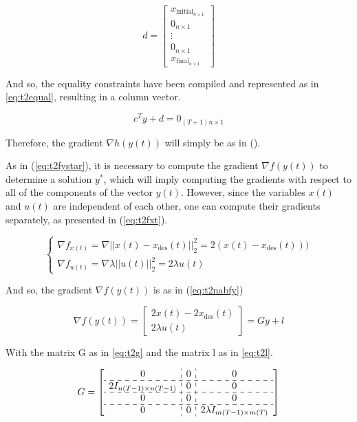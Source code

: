 \begin{equation}
\label{eq:t2d}
d = 
\left[
\begin{array}{c}
x_{{\text{initial}}_{n\times 1}} \\
0_{n\times 1} \\
\vdots \\
0_{n \times 1} \\
x_{{\text{final}}_{n\times 1}}
\end{array}
\right]
\end{equation}


And so, the equality constraints have been compiled and represented as in \eqref{eq:t2equal}, resulting in a column vector.

\begin{equation}
\label{eq:t2equal}
    c^T y + d = 0_{(T+1)n\times 1}
\end{equation}

Therefore, the gradient $\nabla h(y(t))$ will simply be as in ().


As in (\ref{eq:t2fystar}), it is necessary to compute the gradient $\nabla f(y(t))$ to determine a solution $y^*$, which will imply computing the gradients with respect to all of the components of the vector $y(t)$. However, since the variables $x(t)$ and $u(t)$ are independent of each other, one can compute their gradients separately, as presented in (\ref{eq:t2fxt}).

\begin{equation}
\label{eq:t2fxt}
\begin{cases}
	\nabla f_{x(t)} = \nabla ||x(t) - x_{\text{des}}(t)||_2^2 = 2(x(t) - x_\text{des}(t))) \\
	\nabla f_{u(t)} = \nabla \lambda||u(t)||_2^2 = 2\lambda u(t)
\end{cases}
\end{equation}

And so, the gradient $\nabla f(y(t))$ is as in (\ref{eq:t2nabfy})

\begin{equation}
\label{eq:t2nabfy}
\nabla f(y(t)) = 
\left[
\begin{array}{c}
2 x(t) - 2x_\text{des}(t) \\
2 \lambda u(t)
\end{array}
\right]
= Gy + l
\end{equation}

With the matrix G as in \eqref{eq:t2g} and the matrix l as in \eqref{eq:t2l}.

\begin{equation}
\label{eq:t2g}
G = 
\left[
\begin{array}{c : c : c}
0 & 0 & 0 \\ \hdashline
2I_{n(T-1) \times n(T-1)} & 0 & 0 \\ \hdashline
0 & 0 & 0 \\ \hdashline
0 & 0 & 2 \lambda I_{m(T-1) \times m(T)}
\end{array}
\right]
\end{equation}

